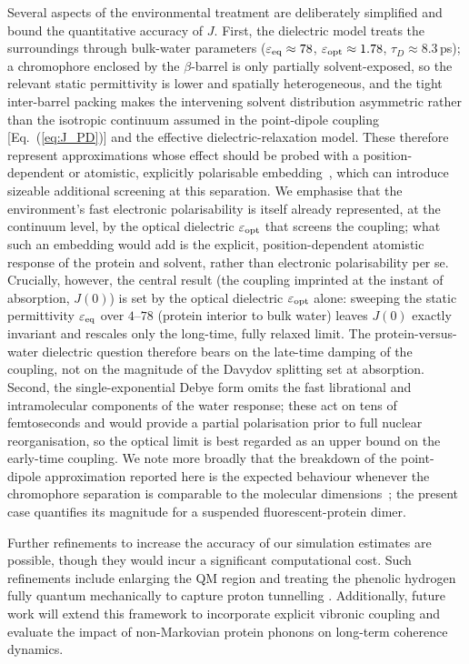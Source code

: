 \documentclass[journal=jpcbfk, manuscript=article, layout=twocolumn, doi=true]{achemso}
\begin{document}
{Several aspects of the environmental treatment are deliberately simplified and bound the quantitative accuracy of $J$. First, the dielectric model treats the surroundings through bulk-water parameters ($\varepsilon_{\rm eq}\approx 78$, $\varepsilon_{\rm opt}\approx 1.78$, $\tau_D\approx 8.3$\,ps); a chromophore enclosed by the $\beta$-barrel is only partially solvent-exposed, so the relevant static permittivity is lower and spatially heterogeneous, and the tight inter-barrel packing makes the intervening solvent distribution asymmetric rather than the isotropic continuum assumed in the point-dipole coupling [Eq.~(\ref{eq:J_PD})] and the effective dielectric-relaxation model. These therefore represent approximations whose effect should be probed with a position-dependent or atomistic, explicitly polarisable embedding~\cite{ozaydin2023unraveling, mennucci2012}, which can introduce sizeable additional screening at this separation. We emphasise that the environment's fast electronic polarisability is itself already represented, at the continuum level, by the optical dielectric $\varepsilon_{\rm opt}$ that screens the coupling; what such an embedding would add is the explicit, position-dependent atomistic response of the protein and solvent, rather than electronic polarisability per se. Crucially, however, the central result (the coupling imprinted at the instant of absorption, $J(0)$) is set by the optical dielectric $\varepsilon_{\rm opt}$ alone: sweeping the static permittivity $\varepsilon_{\rm eq}$ over $4$--$78$ (protein interior to bulk water) leaves $J(0)$ exactly invariant and rescales only the long-time, fully relaxed limit. The protein-versus-water dielectric question therefore bears on the late-time damping of the coupling, not on the magnitude of the Davydov splitting set at absorption. Second, the single-exponential Debye form omits the fast librational and intramolecular components of the water response; these act on tens of femtoseconds and would provide a partial polarisation prior to full nuclear reorganisation, so the optical limit is best regarded as an upper bound on the early-time coupling. We note more broadly that the breakdown of the point-dipole approximation reported here is the expected behaviour whenever the chromophore separation is comparable to the molecular dimensions~\cite{sobakinskaya2018theory, scholes2003}; the present case quantifies its magnitude for a suspended fluorescent-protein dimer.}

Further refinements to increase the accuracy of our simulation estimates are possible, though they would incur a significant computational cost. Such refinements include enlarging the QM region and treating the phenolic hydrogen fully quantum mechanically to capture proton tunnelling \cite{chakraborty2008development,bourne2024quantum}. Additionally, future work will extend this framework to incorporate explicit vibronic coupling and evaluate the impact of non-Markovian protein phonons on long-term coherence dynamics.
\end{document}

